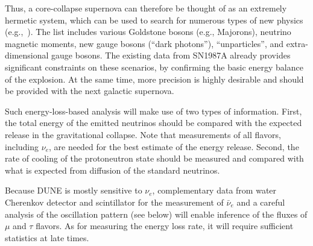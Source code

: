 Thus, a core-collapse supernova can therefore be thought of as an extremely hermetic system, which can be used to search for numerous types of new physics (e.g.,~\cite{Schramm:1990pf,Raffelt:1999tx}). The list includes various Goldstone bosons (e.g., Majorons), neutrino magnetic moments, new gauge bosons (``dark photons''), ``unparticles'', and extra-dimensional gauge bosons. The existing data from SN1987A already provides significant constraints on these scenarios, by confirming the basic energy balance of the explosion. At the same time, more precision is highly desirable and should be provided with the next galactic supernova. 




Such energy-loss-based analysis will make use of two types of information. First, the total energy of the emitted neutrinos should be compared with the expected release in the gravitational collapse.  Note that measurements of all flavors, including $\nu_e$, are needed for the best estimate of the energy release.
Second, the rate of cooling of the protoneutron state should be measured and compared with what is expected from diffusion of the standard neutrinos.%

Because DUNE is mostly sensitive to $\nu_e$, complementary data from
water Cherenkov detector and scintillator for the measurement of
$\bar\nu_{e}$ and a careful analysis of the oscillation pattern (see
below) will enable inference of the fluxes of $\mu$ and $\tau$
flavors. As for measuring the energy loss rate, it will require
sufficient statistics at late times.

